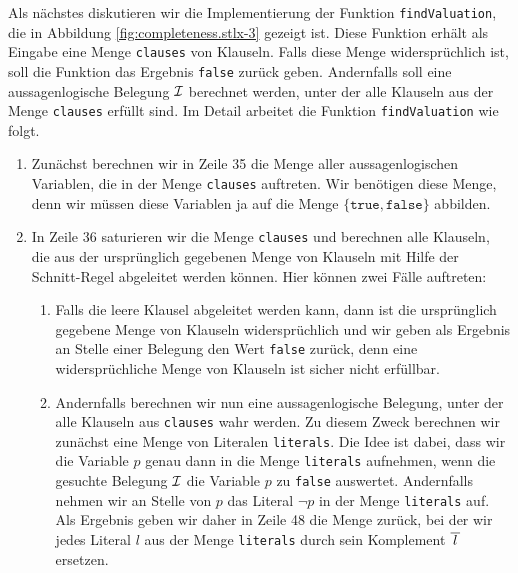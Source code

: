 Als n\"{a}chstes diskutieren wir die Implementierung der Funktion \texttt{findValuation}, die in
Abbildung \ref{fig:completeness.stlx-3} gezeigt ist.  Diese Funktion erh\"{a}lt als Eingabe eine Menge
\texttt{clauses} von Klauseln.  Falls diese Menge widerspr\"{u}chlich ist, soll die Funktion
das Ergebnis \texttt{false} zur\"{u}ck geben.  Andernfalls soll eine aussagenlogische Belegung $\mathcal{I}$ berechnet werden,
unter der alle Klauseln aus der Menge \texttt{clauses} erf\"{u}llt sind.  Im Detail arbeitet die
Funktion \texttt{findValuation} wie folgt.
\begin{enumerate}
\item Zun\"{a}chst berechnen wir in Zeile 35 die Menge aller aussagenlogischen Variablen, die in
      der Menge \texttt{clauses} auftreten.  Wir ben\"{o}tigen diese Menge, denn wir m\"{u}ssen diese
      Variablen ja auf die Menge $\{ \mathtt{true}, \mathtt{false} \}$ abbilden.
\item In Zeile 36 saturieren wir die Menge \texttt{clauses} und berechnen alle Klauseln, die aus der
      urspr\"{u}nglich gegebenen Menge von Klauseln mit Hilfe der Schnitt-Regel abgeleitet werden
      k\"{o}nnen.  Hier k\"{o}nnen zwei F\"{a}lle auftreten:
      \begin{enumerate}
      \item Falls die leere Klausel abgeleitet werden kann, dann ist die urspr\"{u}nglich gegebene Menge
            von Klauseln widerspr\"{u}chlich und wir geben als Ergebnis an Stelle einer Belegung den
            Wert \texttt{false} zur\"{u}ck, denn eine widerspr\"{u}chliche Menge von Klauseln ist sicher
            nicht erf\"{u}llbar.
      \item Andernfalls berechnen wir nun eine aussagenlogische Belegung, unter der alle Klauseln aus
            \texttt{clauses} wahr werden.  Zu diesem Zweck berechnen wir zun\"{a}chst eine Menge von
            Literalen \texttt{literals}.  Die Idee ist dabei, dass wir die Variable $p$ genau
            dann in die Menge \texttt{literals} aufnehmen, wenn die gesuchte Belegung $\mathcal{I}$ die
            Variable $p$ zu \texttt{false} auswertet.  Andernfalls nehmen wir an Stelle von $p$ das
            Literal $\neg p$ in der Menge \texttt{literals} auf.  Als Ergebnis geben wir daher in
            Zeile 48 die Menge zur\"{u}ck, bei der wir jedes Literal $l$ aus der Menge \texttt{literals}
            durch sein Komplement $\overline{\,l\,}$ ersetzen.  


\end{enumerate}
\end{enumerate}
